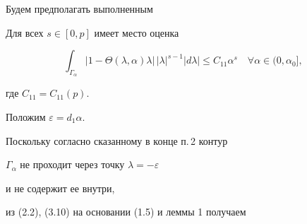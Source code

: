 Будем предполагать выполненным





\begin{cond}


Для всех $s \in [0,p]$ имеет место оценка


\begin{equation}


\int_{\Gamma_{\alpha}}


| 1- \Theta( \lambda, \alpha) \lambda |\,


{| \lambda |}^{s-1} | d \lambda | \leq


C_{11} {\alpha}^s \quad \forall \alpha \in (0, \alpha_0],


\tag{3.10}


\end{equation}


где $C_{11}=C_{11}(p)$.


\end{cond}





Положим $\varepsilon = d_1 \alpha$.


Поскольку согласно сказанному в конце п.\,2 контур


$\Gamma_{\alpha}$ не проходит через точку $\lambda=- \varepsilon$


и не содержит ее внутри,


из (2.2), (3.10) на основании (1.5) и леммы 1 получаем


